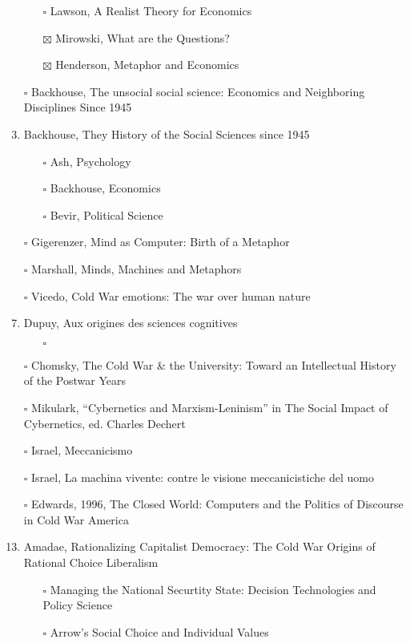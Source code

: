 \documentclass[paper=B6,portrait,twoside=true,twocolumn=false,headinclude=true,footinclude=false,fontsize=12,BCOR=10mm,DIV=calc,pagesize=auto,titlepage=firstiscover,mpinclude=false,headings=normal,headings=twolinechapter,open=right,toc=graduated,chapterprefix=false,numbers=endperiod,parskip=half+]{scrbook}
\theoremstyle{definition}
\begin{document}
\begin{enumerate}
\begin{itemize}
\item[{$\square$}] Lawson, A Realist Theory for Economics
\item[{$\boxtimes$}] Mirowski, What are the Questions?
\item[{$\boxtimes$}] Henderson, Metaphor and Economics
\end{itemize}
\item[{$\square$}] Backhouse, The unsocial social science: Economics and Neighboring Disciplines Since 1945
\item\relax [0/3] Backhouse, They History of the Social Sciences since 1945
\begin{itemize}
\item[{$\square$}] Ash, Psychology
\item[{$\square$}] Backhouse, Economics
\item[{$\square$}] Bevir, Political Science
\end{itemize}
\item[{$\square$}] Gigerenzer, Mind as Computer: Birth of a Metaphor
\item[{$\square$}] Marshall, Minds, Machines and Metaphors
\item[{$\square$}] Vicedo, Cold War emotions: The war over human nature
\item\relax [0/1] Dupuy, Aux origines des sciences cognitives
\begin{itemize}
\item[{$\square$}] 
\end{itemize}
\item[{$\square$}] Chomsky, The Cold War \& the University: Toward an Intellectual History of the Postwar Years
\item[{$\square$}] Mikulark, ``Cybernetics and Marxism-Leninism'' in The Social Impact of Cybernetics, ed. Charles Dechert
\item[{$\square$}] Israel,  Meccanicismo
\item[{$\square$}] Israel, La machina vivente: contre le visione meccanicistiche del uomo
\item[{$\square$}] Edwards, 1996, The Closed World: Computers and the Politics of Discourse in Cold War America
\item\relax [0/9] Amadae, Rationalizing Capitalist Democracy: The Cold War Origins of
Rational Choice Liberalism
\begin{itemize}
\item[{$\square$}] Managing the National Securtity State: Decision Technologies and Policy Science
\item[{$\square$}] Arrow's Social Choice and Individual Values

\end{itemize}
\end{enumerate}
\end{document}
